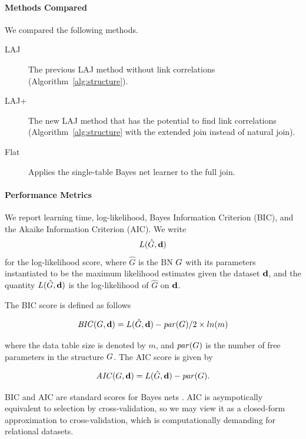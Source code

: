 \documentclass{article}
\begin{document}
\paragraph{Methods Compared}

We compared the following methods.

\begin{description}
\item[LAJ] The previous LAJ method without link correlations (Algorithm~\ref{alg:structure}).
\item[LAJ+] The new LAJ method that has the potential to find link correlations (Algorithm~\ref{alg:structure} with the extended join instead of natural join).
\item[Flat] Applies the single-table Bayes net learner to the full join.
\end{description}

\paragraph{Performance Metrics} We report learning time, log-likelihood, Bayes Information Criterion (BIC), and the Akaike Information Criterion (AIC). We write 
$$L(\hat{G},\mathbf{d})$$ for the log-likelihood score, 
where $\hat{G}$ is the BN $G$ with its parameters instantiated to be the maximum likelihood estimates given the dataset $\mathbf{d}$, and the quantity $L(\hat{G},\mathbf{d})$ is the log-likelihood of $\hat{G}$ on $\mathbf{d}$. 

The BIC score is defined as follows \cite{Chickering2003,Schulte2011}

$$\mathit{BIC}(G,\mathbf{d}) = L(\hat{G},\mathbf{d}) - \mathit{par}(G)/2 \times ln(m)$$

where the data table size is denoted by $m$, and $\mathit{par}(G)$ is the number of free parameters in the structure $G$. The AIC score is given by 

$$\mathit{AIC}(G,\mathbf{d}) = L(\hat{G},\mathbf{d}) - \mathit{par}(G). $$

BIC and AIC are standard scores for Bayes nets \cite{Chickering2003}. AIC is asympotically equivalent to selection by cross-validation, so we may view it as a closed-form approximation to cross-validation,  which is computationally demanding for relational datasets. 
\end{document}
